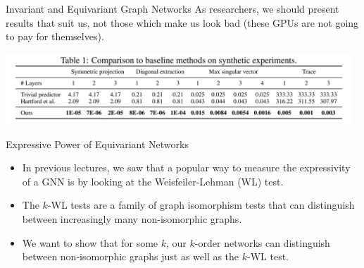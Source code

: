 \documentclass{beamer}
\begin{document}
\begin{frame}{Invariant and Equivariant Graph Networks}
    As researchers, we should present results that suit us, not those which make us look bad (these GPUs are not going to pay for themselves).
    \begin{center}
        \includegraphics[width=0.98\textwidth]{../figures/synth.png}
    \end{center}
\end{frame}
\begin{frame}{Expressive Power of Equivariant Networks}
    \begin{itemize}
        \item In previous lectures, we saw that a popular way to measure the expressivity of a GNN is by looking at the Weisfeiler-Lehman (WL) test.
        \pause
        \item The $k$-WL tests are a family of graph isomorphism tests that can distinguish between increasingly many non-isomorphic graphs.
        \item We want to show that for some $k$, our $k$-order networks can distinguish between non-isomorphic graphs just as well as the $k$-WL test.
    \end{itemize}
\end{frame}
\end{document}
